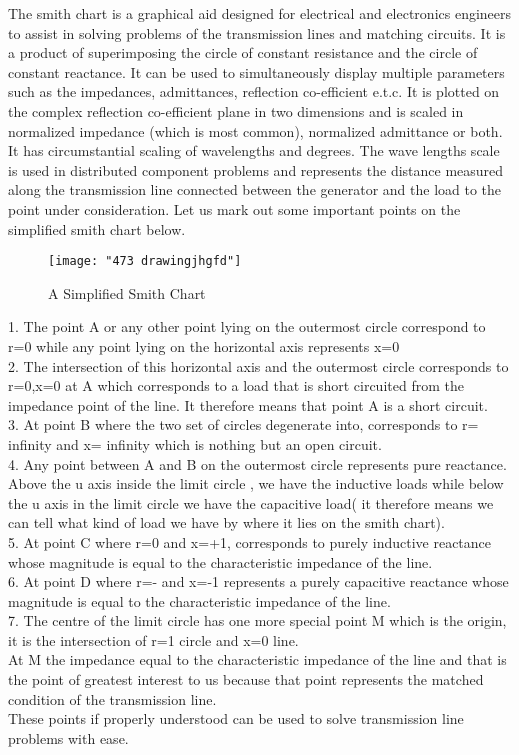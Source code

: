 The smith chart is a graphical aid designed for electrical and electronics engineers to assist in solving problems of the transmission lines and matching circuits. It is a product of superimposing the circle of constant resistance and the circle of constant reactance. It can be used to simultaneously display multiple parameters such as the impedances, admittances, reflection co-efficient e.t.c.
It is plotted on the complex reflection co-efficient plane in two dimensions and is scaled in normalized impedance (which is most common), normalized admittance or both. It has circumstantial scaling of wavelengths and degrees. The wave lengths scale is used in distributed component problems and represents the distance measured along the transmission line connected between the generator and the load to the point under consideration.
Let us mark out some important points on the simplified smith chart below.
\\
\begin{figure}[h]
	\centering
	\texttt{[image: "473 drawingjhgfd"]}
	\caption{A Simplified Smith Chart}
	\label{fig:473-drawingjhgfd}
\end{figure}

1.	The point A or any other point lying on the outermost circle correspond to r=0 while any point lying on the horizontal axis represents x=0\\
2.	The intersection of this horizontal axis and the outermost circle corresponds to r=0,x=0 at A which corresponds to a load that is short circuited from the impedance point of the line. It therefore means that point A is a short circuit.\\
3.	At point B where the two set of circles degenerate into, corresponds to r= infinity and x= infinity which is nothing but an open circuit.\\  
4.	Any point between A and B on the outermost circle represents pure reactance. Above the u axis inside the limit circle , we have the inductive loads while below the u axis in the limit circle we have the capacitive load( it therefore means we can tell what kind of load we have by where it lies on the smith chart).\\
5.	At point C where r=0 and x=+1, corresponds to purely inductive reactance whose magnitude is equal to the characteristic impedance of the line.\\
6.	At point D where r=- and x=-1 represents a purely capacitive reactance whose magnitude is equal to the characteristic impedance of the line.\\
7.	The centre of the limit circle has one more special point M which is the origin, it is the intersection of r=1 circle and x=0 line.\\ At M the impedance equal to the characteristic impedance of the line and that is the point of greatest interest to us because that point represents the matched condition of the transmission line.\\
These points if properly understood can be used to solve transmission line problems with ease.

